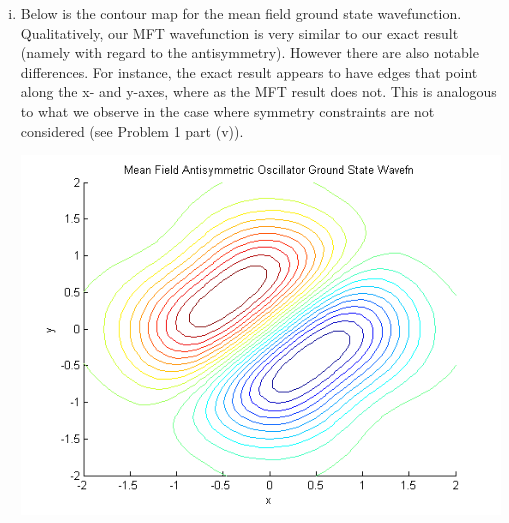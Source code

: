 \documentclass{article}
\begin{document}
\begin{enumerate}[i)]
\begin{center}
    \end{center}
  \item Below is the contour map for the mean field ground state wavefunction. Qualitatively, our MFT wavefunction is very similar to our exact result (namely with regard to the antisymmetry). However there are also notable differences. For instance, the exact result appears to have edges that point along the x- and y-axes, where as the MFT result does not. This is analogous to what we observe in the case where symmetry constraints are not considered (see Problem 1 part (v)).
    \begin{center}
      \includegraphics[scale=0.5]{prob3part3}
    \end{center}

\end{enumerate}
\end{document}

